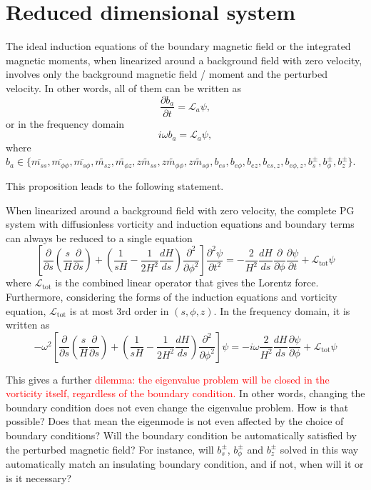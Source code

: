 \section{Reduced dimensional system}

\begin{proposition}
    The ideal induction equations of the boundary magnetic field or the integrated magnetic moments, when linearized around a background field with zero velocity, involves only the background magnetic field / moment and the perturbed velocity. In other words, all of them can be written as
    \[
        \frac{\partial b_a}{\partial t} = \mathcal{L}_a \psi,
    \]
    or in the frequency domain
    \[
        i\omega b_a = \mathcal{L}_a \psi,
    \]
    where $b_a \in \{\overline{m_{ss}},\overline{m_{\phi\phi}},\overline{m_{s\phi}},\widetilde{m_{sz}},\widetilde{m_{\phi z}},\widetilde{zm_{ss}},\widetilde{zm_{\phi\phi}},\widetilde{zm_{s\phi}},b_{es},b_{e\phi},b_{ez},b_{es,z},b_{e\phi,z},b_s^\pm,b_\phi^\pm,b_z^\pm\}$.
\end{proposition}
This proposition leads to the following statement.
\begin{corollary}
    \label{corollary:reduced-eigen}
    When linearized around a background field with zero velocity, the complete PG system with diffusionless vorticity and induction equations and boundary terms can always be reduced to a single equation
    \[
        \left[\frac{\partial}{\partial s}\left(\frac{s}{H}\frac{\partial}{\partial s}\right) + \left(\frac{1}{sH} - \frac{1}{2H^2} \frac{dH}{ds}\right)\frac{\partial^2}{\partial \phi^2}\right] \frac{\partial^2 \psi}{\partial t^2} = - \frac{2}{H^2}\frac{dH}{ds} \frac{\partial}{\partial \phi}\frac{\partial \psi}{\partial t} + \mathcal{L}_\mathrm{tot} \psi
    \]
    where $\mathcal{L}_\mathrm{tot}$ is the combined linear operator that gives the Lorentz force. Furthermore, considering the forms of the induction equations and vorticity equation, $\mathcal{L}_\mathrm{tot}$ is at most 3rd order in $(s,\phi,z)$. In the frequency domain, it is written as
    \[
        -\omega^2\left[\frac{\partial}{\partial s}\left(\frac{s}{H}\frac{\partial}{\partial s}\right) + \left(\frac{1}{sH} - \frac{1}{2H^2} \frac{dH}{ds}\right)\frac{\partial^2}{\partial \phi^2}\right] \psi = -i\omega \frac{2}{H^2}\frac{dH}{ds} \frac{\partial \psi}{\partial \phi} + \mathcal{L}_\mathrm{tot} \psi
    \]
\end{corollary}

This gives a further \textcolor{red}{dilemma: the eigenvalue problem will be closed in the vorticity itself, regardless of the boundary condition.} In other words, changing the boundary condition does not even change the eigenvalue problem. How is that possible? Does that mean the eigenmode is not even affected by the choice of boundary conditions? Will the boundary condition be automatically satisfied by the perturbed magnetic field? For instance, will $b_s^\pm$, $b_\phi^\pm$ and $b_z^\pm$ solved in this way automatically match an insulating boundary condition, and if not, when will it or is it necessary?

